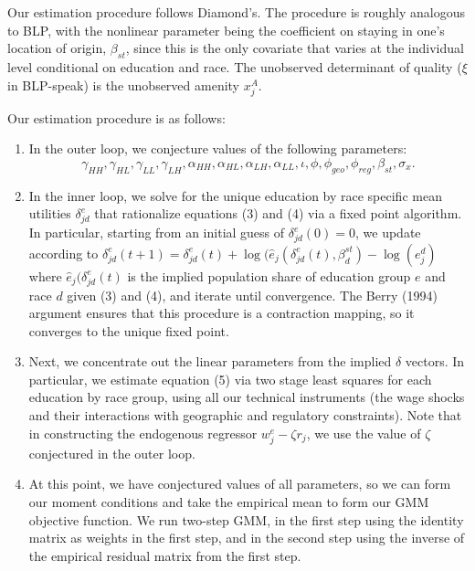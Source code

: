 \documentclass{article}
\begin{document}
Our estimation procedure follows Diamond's. The procedure is roughly analogous to BLP, with the nonlinear parameter being the coefficient on staying in one's location of origin, $\beta_{st}$, since this is the only covariate that varies at the individual level conditional on education and race. The unobserved determinant of quality ($\xi$ in BLP-speak) is the unobserved amenity $x_j^A$. 

Our estimation procedure is as follows: 
\begin{enumerate}
\item In the outer loop, we conjecture values of the following parameters: $$\gamma_{HH}, \gamma_{HL}, \gamma_{LL}, \gamma_{LH}, \alpha_{HH}, \alpha_{HL}, \alpha_{LH}, \alpha_{LL},  \iota, \phi, \phi_{geo}, \phi_{reg}, \beta_{st}, \sigma_x.$$
\item In the inner loop, we solve for the unique education by race specific mean utilities $\delta_{jd}^e$ that rationalize equations (3) and (4) via a fixed point algorithm. In particular, starting from an initial guess of $\delta_{jd}^e(0) =0$, we update according to $\delta_{jd}^e(t+1)=\delta_{jd}^e(t) + \log(\hat{e}_j(\delta_{jd}^e(t), \beta_d^{st}) - \log(e_j^d)$  where $\hat{e}_j(\delta_{jd}^e(t)$ is the implied population share of education group $e$ and race $d$ given (3) and (4), and iterate until convergence. The Berry (1994) argument ensures that this procedure is a contraction mapping, so it converges to the unique fixed point.


\item Next, we concentrate out the linear parameters from the implied $\delta$ vectors. In particular, we estimate equation (5) via two stage least squares for each education by race group, using all our technical instruments (the wage shocks and their interactions with geographic and regulatory constraints). Note that in constructing the endogenous regressor $w_j^e - \zeta r_j$, we use the value of $\zeta$ conjectured in the outer loop.

\item At this point, we have conjectured values of all parameters, so we can form our moment conditions and take the empirical mean to form our GMM objective function. We run two-step GMM, in the first step using the identity matrix as weights in the first step, and in the second step using the inverse of the empirical residual matrix from the first step. 

\end{enumerate}
\end{document}
